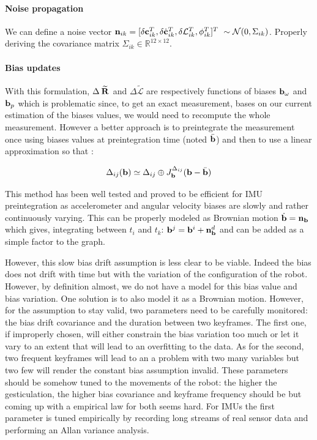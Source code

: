 \documentclass[11pt]{article}
\newcommand{\Rotm}[2]{\prescript{#1}{}{\widetilde{\bfR}}_{#2}}
\newcommand{\noise}{\bfn}
\newcommand{\bias}{\bfb}
\newcommand{\AM}{\mathcal{L}}
\newcommand{\AMm}{\widetilde{\mathcal{L}}}
\newcommand{\COM}{\bfc}
\newcommand{\COMd}{\dot{\bfc}}
\newcommand{\Gaussian}[2]{\mathcal{N}({#1},{#2})}
\newcommand{\Reals}{\mathbb{R}}
\begin{document}
\paragraph{Noise propagation}
We can define a noise vector $\noise_{ik} = [\delta \COM_{ik}^T, \delta \COMd_{ik}^T, \delta \AM_{ik}^T, \phi_{ik}^T]^T ~ \sim \Gaussian{0}{\Sigma_{ik}}$. Properly deriving the covariance matrix $\Sigma_{ik} \in \Reals^{12 \times 12}$. 



\paragraph{Bias updates}
With this formulation, $\Delta \Rotm{}{}$ and $\Delta \AMm{}{}$ are respectively functions of biases $\bias_{\omega}$ and $\bias_{p}$ which is problematic since, to get an exact measurement, bases on our current estimation of the biases values, we would need to recompute the whole measurement. However a better approach is to preintegrate the measurement once using biases values at preintegration time (noted $\bar{\bias}$) and then to use a linear approximation so that :

\begin{equation}
    \Delta_{ij}(\bias) \simeq \Delta_{ij} \oplus J^{\Delta_{ij}}_{\bias} (\bias - \bar{\bias})
\end{equation}

This method has been well tested and proved to be efficient for IMU preintegration as accelerometer and angular velocity biases are slowly and rather continuously varying. This can be properly modeled as Brownian motion $\dot{\bias} = \noise_{\bias}$ which gives, integrating between $t_i$ and $t_k$: $\bias^j = \bias^i + \noise_{\bias}^d$ and can be added as a simple factor to the graph.

However, this slow bias drift assumption is less clear to be viable. Indeed the bias does not drift with time but with the variation of the configuration of the robot. However, by definition almost, we do not have a model for this bias value and bias variation. One solution is to also model it as a Brownian motion. However, for the assumption to stay valid, two parameters need to be carefully monitored: the bias drift covariance and the duration between two keyframes. The first one, if improperly chosen, will either constrain the bias variation too much or let it vary to an extent that will lead to an overfitting to the data. As for the second, two frequent keyframes will lead to an a problem with two many variables but two few will render the constant bias assumption invalid. These parameters should be somehow tuned to the movements of the robot: the higher the gesticulation, the higher bias covariance and keyframe frequency should be but coming up with a empirical law for both seems hard. For IMUs the first parameter is tuned empirically by recording long streams of real sensor data and performing an Allan variance analysis.
\end{document}
